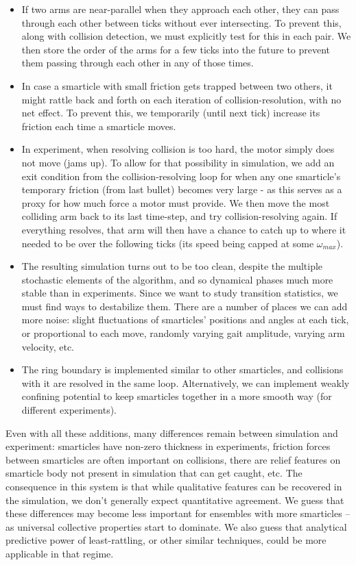 \documentclass[11pt]{article}
\renewcommand{\=}[1]{\stackrel{#1}{=}} %
\renewcommand{\(}{\left (}
\renewcommand{\)}{\right  )}
\renewcommand{\[}{\left [}
\renewcommand{\]}{\right ]}
\newcommand{\<}{\left <}
\renewcommand{\>}{\right >}
\theoremstyle{definition}
\theoremstyle{remark}
\begin{document}
\begin{itemize}
	\item  If two arms are near-parallel when they approach each other, they can pass through each other between ticks without ever intersecting. To prevent this, along with collision detection, we must explicitly test for this in each pair. We then store the order of the arms for a few ticks into the future to prevent them passing through each other in any of those times.
	\item In case a smarticle with small friction gets trapped between two others, it might rattle back and forth on each iteration of collision-resolution, with no net effect. To prevent this, we temporarily (until next tick) increase its friction each time a smarticle moves.
	\item In experiment, when resolving collision is too hard, the motor simply does not move (jams up). To allow for that possibility in simulation, we add an exit condition from the collision-resolving loop for when any one smarticle's temporary friction (from last bullet) becomes very large - as this serves as a proxy for how much force a motor must provide. We then move the most colliding arm back to its last time-step, and try collision-resolving again. If everything resolves, that arm will then have a chance to catch up to where it needed to be over the following ticks (its speed being capped at some $ \omega_{max} $).
	\item The resulting simulation turns out to be too clean, despite the multiple stochastic elements of the algorithm, and so dynamical phases much more stable than in experiments. Since we want to study transition statistics, we must find ways to destabilize them. There are a number of places we can add more noise: slight fluctuations of smarticles' positions and angles at each tick, or proportional to each move, randomly varying gait amplitude, varying arm velocity, etc.
	\item The ring boundary is implemented similar to other smarticles, and collisions with it are resolved in the same loop. Alternatively, we can implement weakly confining potential to keep smarticles together in a more smooth way (for different experiments).
\end{itemize}

Even with all these additions, many differences remain between simulation and experiment: smarticles have non-zero thickness in experiments, friction forces between smarticles are often important on collisions, there are relief features on smarticle body not present in simulation that can get caught, etc. The consequence in this system is that while qualitative features can be recovered in the simulation, we don't generally expect quantitative agreement. We guess that these differences may become less important for ensembles with more smarticles -- as universal collective properties start to dominate. We also guess that analytical predictive power of least-rattling, or other similar techniques, could be more applicable in that regime.
\end{document}
